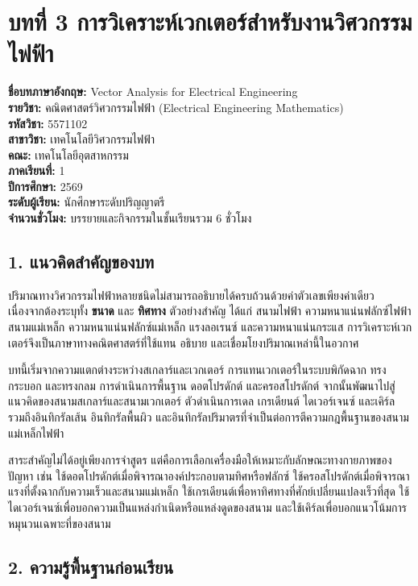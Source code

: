 \section{บทที่ 3 การวิเคราะห์เวกเตอร์สำหรับงานวิศวกรรมไฟฟ้า}

\textbf{ชื่อบทภาษาอังกฤษ:} Vector Analysis for Electrical Engineering\\
\textbf{รายวิชา:} คณิตศาสตร์วิศวกรรมไฟฟ้า (Electrical Engineering Mathematics)\\
\textbf{รหัสวิชา:} 5571102\\
\textbf{สาขาวิชา:} เทคโนโลยีวิศวกรรมไฟฟ้า\\
\textbf{คณะ:} เทคโนโลยีอุตสาหกรรม\\
\textbf{ภาคเรียนที่:} 1\\
\textbf{ปีการศึกษา:} 2569\\
\textbf{ระดับผู้เรียน:} นักศึกษาระดับปริญญาตรี\\
\textbf{จำนวนชั่วโมง:} บรรยายและกิจกรรมในชั้นเรียนรวม 6 ชั่วโมง\\

\subsection{1. แนวคิดสำคัญของบท}

ปริมาณทางวิศวกรรมไฟฟ้าหลายชนิดไม่สามารถอธิบายได้ครบถ้วนด้วยค่าตัวเลขเพียงค่าเดียว เนื่องจากต้องระบุทั้ง \textbf{ขนาด} และ \textbf{ทิศทาง} ตัวอย่างสำคัญ ได้แก่ สนามไฟฟ้า ความหนาแน่นฟลักซ์ไฟฟ้า สนามแม่เหล็ก ความหนาแน่นฟลักซ์แม่เหล็ก แรงลอเรนซ์ และความหนาแน่นกระแส การวิเคราะห์เวกเตอร์จึงเป็นภาษาทางคณิตศาสตร์ที่ใช้แทน อธิบาย และเชื่อมโยงปริมาณเหล่านี้ในอวกาศ

บทนี้เริ่มจากความแตกต่างระหว่างสเกลาร์และเวกเตอร์ การแทนเวกเตอร์ในระบบพิกัดฉาก ทรงกระบอก และทรงกลม การดำเนินการพื้นฐาน ดอตโปรดักต์ และครอสโปรดักต์ จากนั้นพัฒนาไปสู่แนวคิดของสนามสเกลาร์และสนามเวกเตอร์ ตัวดำเนินการเดล เกรเดียนต์ ไดเวอร์เจนซ์ และเคิร์ล รวมถึงอินทิกรัลเส้น อินทิกรัลพื้นผิว และอินทิกรัลปริมาตรที่จำเป็นต่อการตีความกฎพื้นฐานของสนามแม่เหล็กไฟฟ้า

สาระสำคัญไม่ได้อยู่เพียงการจำสูตร แต่คือการเลือกเครื่องมือให้เหมาะกับลักษณะทางกายภาพของปัญหา เช่น ใช้ดอตโปรดักต์เมื่อพิจารณาองค์ประกอบตามทิศหรือฟลักซ์ ใช้ครอสโปรดักต์เมื่อพิจารณาแรงที่ตั้งฉากกับความเร็วและสนามแม่เหล็ก ใช้เกรเดียนต์เพื่อหาทิศทางที่ศักย์เปลี่ยนแปลงเร็วที่สุด ใช้ไดเวอร์เจนซ์เพื่อบอกความเป็นแหล่งกำเนิดหรือแหล่งดูดของสนาม และใช้เคิร์ลเพื่อบอกแนวโน้มการหมุนวนเฉพาะที่ของสนาม

\subsection{2. ความรู้พื้นฐานก่อนเรียน}

